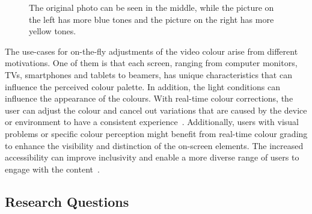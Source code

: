 \documentclass[../MasterThesis.tex]{subfiles}
\begin{document}
	
	\begin{figure}[H]
		\begin{center}
			\caption[Photo in three different colour tones (original, yellow, blue).]{The original photo can be seen in the middle, while the picture on the left has more blue tones and the picture on the right has more yellow tones.}
			\label{figure:coloursblueandyellow}
		\end{center}
	\end{figure}
	The use-cases for on-the-fly adjustments of the video colour arise from different motivations. 
	One of them is that each screen, ranging from computer monitors, TVs, smartphones and tablets to beamers, has unique characteristics that can influence the perceived colour palette. 
	In addition, the light conditions can influence the appearance of the colours.
	With real-time colour corrections, the user can adjust the colour and cancel out variations that are caused by the device or environment to have a consistent experience~\cite{screentype}.
	Additionally, users with visual problems or specific colour perception might benefit from real-time colour grading to enhance the visibility and distinction of the on-screen elements. 
	The increased accessibility can improve inclusivity and enable a more diverse range of users to engage with the content~\cite{accessibility}.
	
	
	

	
	
	
	
	
	
	
	
	
	
	
	\subsection{Research Questions} \label{subsection:researchquestions}
	
\end{document}
